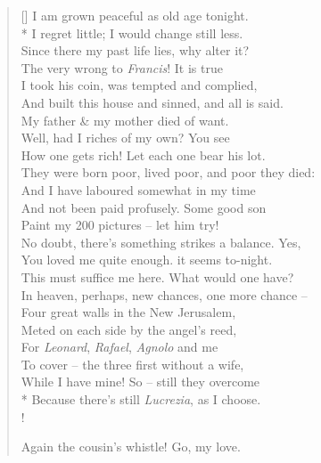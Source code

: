 \documentclass[MAIN]{subfiles}
\begin{document}
\begin{verse}[\versewidth]
I am grown peaceful as old age tonight.\\*
I regret little; I would change still less.\\
Since there my past life lies, why alter it?\\
The very wrong to \emph{Francis}! It is true\\ 
I took his coin, was tempted and complied,\\ 
And built this house and sinned, and all is said.\\ 
My father \& my mother died of want.\\ 
Well, had I riches of my own? You see\\
How one gets rich! Let each one bear his lot.\\
They were born poor, lived poor, and poor they died:\\
And I have laboured somewhat in my time\\
And not been paid profusely. Some good son\\
Paint my 200 pictures -- let him try!\\
No doubt, there's something strikes a balance. Yes,\\
You loved me quite enough. it seems to-night.\\
This must suffice me here. What would one have?\\
In heaven, perhaps, new chances, one more chance --\\
Four great walls in the {\sc New Jerusalem},\\
Meted on each side by the angel's reed,\\
For \emph{Leonard}, \emph{Rafael}, \emph{Agnolo} and me\\ 
To cover -- the three first without a wife,\\
While I have mine! So -- still they overcome\\*
Because there's still \emph{Lucrezia}, as I choose.\\!

Again the cousin's whistle! Go, my love. 
\end{verse}
\end{document}
